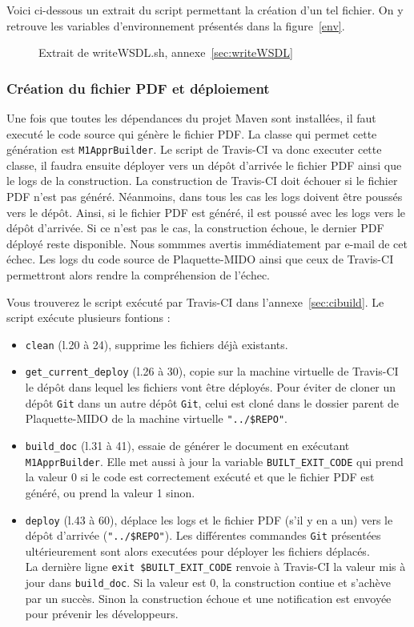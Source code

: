 Voici ci-dessous un extrait du script permettant la création d'un tel fichier. On y retrouve les variables d'environnement présentés dans la figure~\ref{env}.

\begin{figure}[!ht]
    
    \caption*{Extrait de writeWSDL.sh, annexe~\ref{sec:writeWSDL} }
\end{figure}

\subsubsection*{Création du fichier PDF et déploiement}
Une fois que toutes les dépendances du projet Maven sont installées, il faut executé le code source qui génère le fichier PDF. La classe qui permet cette génération est \texttt{M1ApprBuilder}. Le script de Travis-CI va donc executer cette classe, il faudra ensuite déployer vers un dépôt d'arrivée le fichier PDF ainsi que le logs de la construction. La construction de Travis-CI doit échouer si le fichier PDF n'est pas généré. Néanmoins, dans tous les cas les logs doivent être poussés vers le dépôt. Ainsi, si le fichier PDF est généré, il est poussé avec les logs vers le dépôt d'arrivée. Si ce n'est pas le cas, la construction échoue, le dernier PDF déployé reste disponible. Nous sommmes avertis immédiatement par e-mail de cet échec. Les logs du code source de Plaquette-MIDO ainsi que ceux de Travis-CI permettront alors rendre la compréhension de l'échec.

Vous trouverez le script exécuté par Travis-CI dans l'annexe~\ref{sec:cibuild}. Le script exécute plusieurs fontions :

\begin{itemize}
    \item \texttt{clean} (l.20 à 24), supprime les fichiers déjà existants.
    \item \texttt{get\_current\_deploy} (l.26 à 30), copie sur la machine virtuelle de Travis-CI le dépôt dans lequel les fichiers vont être déployés. Pour éviter de cloner un dépôt \texttt{Git} dans un autre dépôt \texttt{Git}, celui est cloné dans le dossier parent de Plaquette-MIDO de la machine virtuelle \texttt{"../\${REPO}"}.
    \item \texttt{build\_doc} (l.31 à 41), essaie de générer le document en exécutant \texttt{M1ApprBuilder}. Elle met aussi à jour la variable \texttt{BUILT\_EXIT\_CODE} qui prend la valeur 0 si le code est correctement exécuté et que le fichier PDF est généré, ou prend la valeur 1 sinon.
    \item \texttt{deploy} (l.43 à 60), déplace les logs et le fichier PDF (s'il y en a un) vers le dépôt d'arrivée (\texttt{"../\${REPO}"}). Les différentes commandes \texttt{Git} présentées ultérieurement sont alors executées pour déployer les fichiers déplacés.\\ La dernière ligne \texttt{exit \${BUILT\_EXIT\_CODE}} renvoie à Travis-CI la valeur mis à jour dans \texttt{build\_doc}. Si la valeur est 0, la construction contiue et s'achève par un succès. Sinon la construction échoue et une notification est envoyée pour prévenir les développeurs.
\end{itemize}


